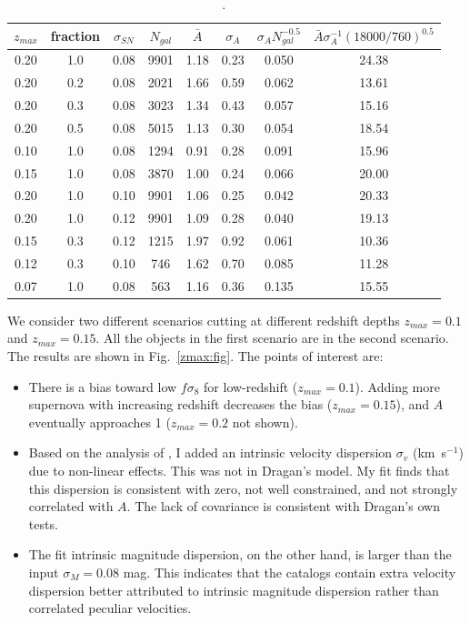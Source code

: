 \documentclass{aastex62}   	%
\begin{document}
\begin{table}
   \centering
   \begin{tabular}{|cccc|cccc|} %
   \hline
$z_{max}$ & fraction & $\sigma_{SN}$ & $N_{gal}$ & $\bar{A}$ & $\sigma_A$ & $\sigma_A N_{gal}^{-0.5}$ & $\bar{A} \sigma_A^{-1} (18000/760)^{0.5}$ \\
\hline
0.20 &  1.0 & 0.08 & 9901 &   1.18 &   0.23 &  0.050 &  24.38 \\ \hline
0.20 &  0.2 & 0.08 & 2021 &   1.66 &   0.59 &  0.062 &  13.61 \\
0.20 &  0.3 & 0.08 & 3023 &   1.34 &   0.43 &  0.057 &  15.16 \\
0.20 &  0.5 & 0.08 & 5015 &   1.13 &   0.30 &  0.054 &  18.54 \\
0.10 &  1.0 & 0.08 & 1294 &   0.91 &   0.28 &  0.091 &  15.96 \\
0.15 &  1.0 & 0.08 & 3870 &   1.00 &   0.24 &  0.066 &  20.00 \\
0.20 &  1.0 & 0.10 & 9901 &   1.06 &   0.25 &  0.042 &  20.33 \\
0.20 &  1.0 & 0.12 & 9901 &   1.09 &   0.28 &  0.040 &  19.13 \\
0.15 &  0.3 & 0.12 & 1215 &   1.97 &   0.92 &  0.061 &  10.36 \\
0.12 &  0.3 & 0.10 & 746 &   1.62 &   0.70 &  0.085 &  11.28 \\
0.07 &  1.0 & 0.08 & 563 &   1.16 &   0.36 &  0.135 &  15.55 \\
    \hline
   \end{tabular}
   \caption{.}
   \label{tab:booktabs}
\end{table}


We consider two different scenarios cutting at different redshift depths $z_{max}=0.1$ and  $z_{max}=0.15$.  All the objects in the first
scenario are in the second scenario.  The results are shown in Fig.~\ref{zmax:fig}.  The points of interest are:
\begin{itemize}
\item There is a bias toward low $f\sigma_8$ for low-redshift ($z_{max}=0.1$).  Adding more supernova with increasing redshift
 decreases the bias  ($z_{max}=0.15$), and $A$ eventually approaches 1 ($z_{max}=0.2$ not shown).
 \item Based on the analysis of \citet{2017MNRAS.471.3135H}, I added an intrinsic velocity dispersion $\sigma_v$ (km~s$^{-1}$) due to non-linear effects.  This was not
 in Dragan's model.  My fit finds that this  dispersion is consistent with zero, not well constrained, and not strongly correlated with
 $A$.  The lack of covariance is consistent with Dragan's own tests.
 \item The fit intrinsic magnitude dispersion, on the other hand, is larger than the input $\sigma_M=0.08$ mag.  This  indicates that the catalogs
 contain 
 extra  velocity dispersion better attributed to intrinsic magnitude dispersion rather than correlated peculiar velocities.
\end{itemize}
\end{document}
